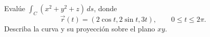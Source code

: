 Evalúe $\int_C(x^2+y^2+z)\,ds$, donde
\[
\vec r(t)=(2\cos t,2\sin t,3t),\qquad 0\leq t\leq2\pi.
\]
Describa la curva y su proyección sobre el plano $xy$.
